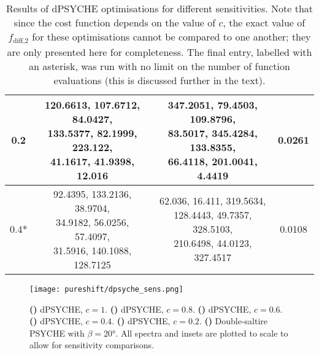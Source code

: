 \begin{table}[htb]
\begin{tabular}{cccc}
        \midrule
        0.2 & \makecell{120.6613, 107.6712, 84.0427, \\ 133.5377, 82.1999, 223.122, \\ 41.1617, 41.9398, 12.016} & \makecell{347.2051, 79.4503, 109.8796, \\ 83.5017, 345.4284, 133.8355, \\ 66.4118, 201.0041, 4.4419} & 0.0261 \\
        \midrule
        0.4* & \makecell{92.4395, 133.2136, 38.9704, \\ 34.9182, 56.0256, 57.4097, \\ 31.5916, 140.1088, 128.7125} & \makecell{62.036, 16.411, 319.5634, \\ 128.4443, 49.7357, 328.5103, \\ 210.6498, 44.0123, 327.4517} & 0.0108 \\
        \bottomrule
    \end{tabular}
    \caption[dPSYCHE optimisation results for different sensitivities]{
        Results of dPSYCHE optimisations for different sensitivities.
        Note that since the cost function depends on the value of $c$, the exact value of $f_\text{diff,2}$ for these optimisations cannot be compared to one another; they are only presented here for completeness.
        The final entry, labelled with an asterisk, was run with no limit on the number of function evaluations (this is discussed further in the text).
    }
    \label{tbl:dpsyche_sens}
\end{table}

\begin{figure}[htbp]
    \centering
    \texttt{[image: pureshift/dpsyche\_sens.png]}%
    {\label{fig:dpsyche_sens_d1}}%
    {\label{fig:dpsyche_sens_d0p8}}%
    {\label{fig:dpsyche_sens_d0p6}}%
    {\label{fig:dpsyche_sens_d0p4}}%
    {\label{fig:dpsyche_sens_d0p2}}%
    {\label{fig:dpsyche_sens_p}}%
    \caption[dPSYCHE optimisations with different sensitivities]{
        \textbf{()} dPSYCHE, $c = 1$.
        \textbf{()} dPSYCHE, $c = 0.8$.
        \textbf{()} dPSYCHE, $c = 0.6$.
        \textbf{()} dPSYCHE, $c = 0.4$.
        \textbf{()} dPSYCHE, $c = 0.2$.
        \textbf{()} Double-saltire PSYCHE with $\beta = \ang{20}$.
        All spectra and insets are plotted to scale to allow for sensitivity comparisons.
    }
    \label{fig:dpsyche_sens}
\end{figure}

